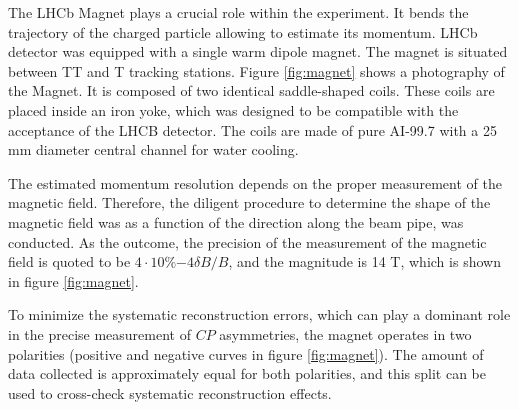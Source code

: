 The LHCb Magnet plays a crucial role within the experiment. It bends the trajectory of the charged particle allowing to estimate its momentum. LHCb detector was equipped with a single warm dipole magnet. The magnet is situated between TT and T tracking stations. 
Figure \ref{fig:magnet} shows a photography of the Magnet. It is composed of two identical saddle-shaped coils. These coils are placed inside an iron yoke, which was designed to be compatible with the acceptance of the LHCB detector. The coils are made of pure AI-99.7 with a 25 mm diameter central channel for water cooling. 

The estimated momentum resolution depends on the proper measurement of the magnetic field. Therefore, the diligent procedure to determine the shape of the magnetic field was as a function of the direction along the beam pipe, was conducted. As the outcome, the precision of the measurement of the magnetic field is quoted to be $4 \cdot 10 \%{-4} \delta B /B $, and the magnitude is 14 T, which is shown in figure \ref{fig:magnet}. 

To minimize the systematic reconstruction errors, which can play a dominant role in the precise measurement of $CP$ asymmetries,  the magnet operates in two polarities (positive and negative curves in figure \ref{fig:magnet}). The amount of data collected is approximately equal for both polarities, and this split can be used to cross-check systematic reconstruction effects.   



